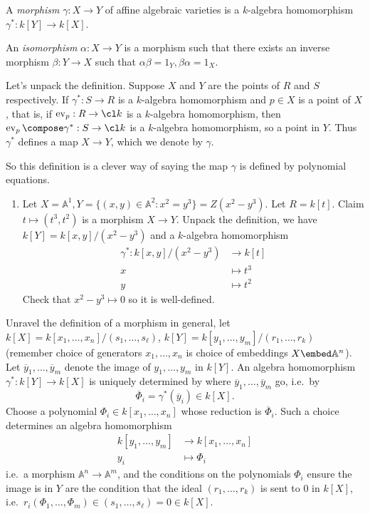 \documentclass[a4paper]{article}
\renewcommand{\A}{\mathbb{A}}
\DeclareMathOperator{\ev}{ev}
\begin{document}
\begin{definition}[morphism]
  A \emph{morphism} \(\gamma: X \to Y\) of affine algebraic varieties is a \(k\)-algebra homomorphism \(\gamma^*: k[Y] \to k[X]\).

  An \emph{isomorphism} \(\alpha: X \to Y\) is a morphism such that there exists an inverse morphism \(\beta: Y \to X\) such that \(\alpha\beta = 1_Y, \beta\alpha = 1_X\).
\end{definition}

Let's unpack the definition. Suppose \(X\) and \(Y\) are the points of \(R\) and \(S\) respectively. If \(\gamma^*: S \to R\) is a \(k\)-algebra homomorphism and \(p \in X\) is a point of \(X\), that is, if \(\ev_p: R \to \cl k\) is a \(k\)-algebra homomorphism, then \(\ev_p \compose \gamma^*: S \to \cl k\) is a \(k\)-algebra homomorphism, so a point in \(Y\). Thus \(\gamma^*\) defines a map \(X \to Y\), which we denote by \(\gamma\).

So this definition is a clever way of saying the map \(\gamma\) is defined by polynomial equations.

\begin{eg}\leavevmode
  \begin{enumerate}
  \item Let \(X = \A^1, Y = \{(x, y) \in \A^2: x^2 = y^3\} = Z(x^2 - y^3)\). Let \(R = k[t]\). Claim \(t \mapsto (t^3, t^2)\) is a morphism \(X \to Y\). Unpack the definition, we have \(k[Y] = k[x, y]/(x^2 - y^3)\) and a \(k\)-algebra homomorphism
    \begin{align*}
      \gamma^*: k[x, y]/(x^2 - y^3) &\to k[t] \\
      x &\mapsto t^3 \\
      y &\mapsto t^2
    \end{align*}
    Check that \(x^2 - y^3 \mapsto 0\) so it is well-defined.
  \end{enumerate}
\end{eg}

Unravel the definition of a morphism in general, let \(k[X] = k[x_1, \dots, x_n]/(s_1, \dots, s_\ell)\), \(k[Y] = k[y_1, \dots, y_m]/(r_1, \dots, r_k)\) (remember choice of generators \(x_1, \dots, x_n\) is choice of embeddings \(X \embed \A^n\)). Let \(\overline y_1, \dots, \overline y_m\) denote the image of \(y_1, \dots, y_m\) in \(k[Y]\). An algebra homomorphism \(\gamma^*: k[Y] \to k[X]\) is uniquely determined by where \(\overline y_1, \dots, \overline y_m\) go, i.e.\ by
\[
  \overline \Phi_i = \gamma^*(\overline y_i) \in k[X].
\]
Choose a polynomial \(\Phi_i \in k[x_1, \dots, x_n]\) whose reduction is \(\overline \Phi_i\). Such a choice determines an algebra homomorphism
\begin{align*}
  k[y_1, \dots, y_m] &\to k[x_1, \dots, x_n] \\
  y_i &\mapsto \Phi_i
\end{align*}
i.e.\ a morphism \(\A^n \to \A^m\), and the conditions on the polynomials \(\Phi_i\) ensure the image is in \(Y\) are the condition that the ideal \((r_1, \dots, r_k)\) is sent to \(0\) in \(k[X]\), i.e.\ \(r_i(\Phi_1, \dots, \Phi_m) \in (s_1, \dots, s_\ell) = 0 \in k[X]\).
\end{document}
